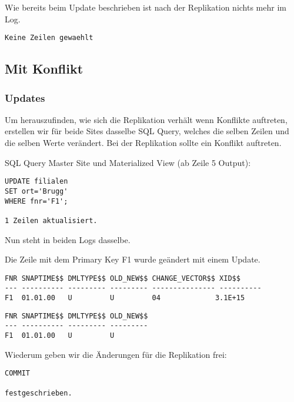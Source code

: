 \documentclass[11pt,a4paper,parskip=half]{scrartcl}
\begin{document}
Wie bereits beim Update beschrieben ist nach der Replikation nichts mehr im Log.
\begin{lstlisting}
Keine Zeilen gewaehlt
\end{lstlisting}

\subsection{Mit Konflikt}
\subsubsection{Updates}
Um herauszufinden, wie sich die Replikation verhält wenn Konflikte auftreten, erstellen wir für beide Sites dasselbe SQL Query, welches die selben Zeilen und die selben Werte verändert. Bei der Replikation sollte ein Konflikt auftreten.

SQL Query Master Site und Materialized View (ab Zeile 5 Output):
\begin{lstlisting}
UPDATE filialen
SET ort='Brugg'
WHERE fnr='F1'; 

1 Zeilen aktualisiert.
\end{lstlisting}

Nun steht in beiden Logs dasselbe.

Die Zeile mit dem Primary Key F1 wurde geändert mit einem Update.
\begin{lstlisting}
FNR SNAPTIME$$ DMLTYPE$$ OLD_NEW$$ CHANGE_VECTOR$$ XID$$
--- ---------- --------- --------- --------------- ----------
F1  01.01.00   U         U         04             3.1E+15 
\end{lstlisting}
\begin{lstlisting}
FNR SNAPTIME$$ DMLTYPE$$ OLD_NEW$$
--- ---------- --------- ---------
F1  01.01.00   U         U         
\end{lstlisting}

Wiederum geben wir die Änderungen für die Replikation frei:
\begin{lstlisting}
COMMIT

festgeschrieben.
\end{lstlisting}
\end{document}
